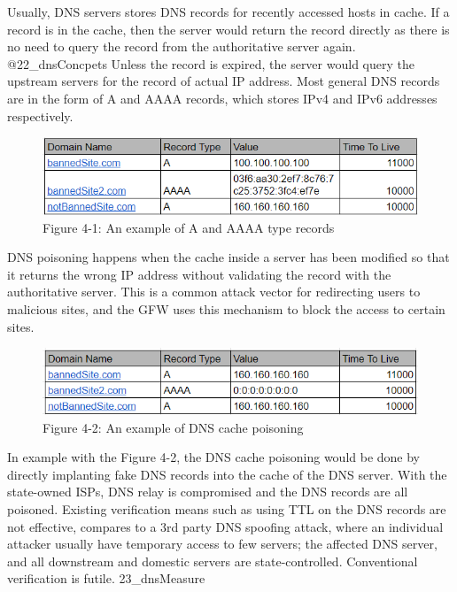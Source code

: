 Usually, DNS servers stores DNS records for recently accessed hosts in
cache. If a record is in the cache, then the server would return the
record directly as there is no need to query the record from the
authoritative server again. @22\_dnsConcpets Unless the record is
expired, the server would query the upstream servers for the record of
actual IP address. Most general DNS records are in the form of A and
AAAA records, which stores IPv4 and IPv6 addresses respectively.

\begin{figure}
\centering
\includegraphics{res/4.1-DNS.png}
\caption{Figure 4-1: An example of A and AAAA type records}
\end{figure}

DNS poisoning happens when the cache inside a server has been modified
so that it returns the wrong IP address without validating the record
with the authoritative server. This is a common attack vector for
redirecting users to malicious sites, and the GFW uses this mechanism to
block the access to certain sites.

\begin{figure}
\centering
\includegraphics{res/4.2-DNS-poisoned.png}
\caption{Figure 4-2: An example of DNS cache poisoning}
\end{figure}

In example with the Figure 4-2, the DNS cache poisoning would be done by
directly implanting fake DNS records into the cache of the DNS server.
With the state-owned ISPs, DNS relay is compromised and the DNS records
are all poisoned. Existing verification means such as using TTL on the
DNS records are not effective, compares to a 3rd party DNS spoofing
attack, where an individual attacker usually have temporary access to
few servers; the affected DNS server, and all downstream and domestic
servers are state-controlled. Conventional verification is futile.
23\_dnsMeasure


